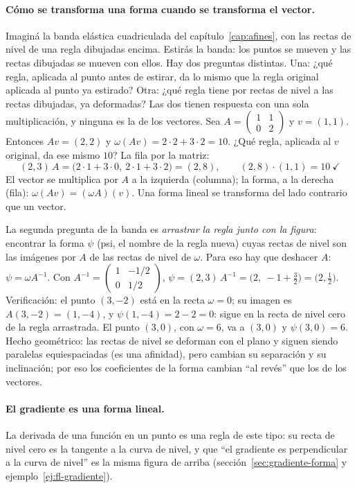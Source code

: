 \paragraph{Cómo se transforma una forma cuando se transforma el vector.} Imaginá la banda
elástica cuadriculada del capítulo~\ref{cap:afines}, con las rectas de nivel de una regla
dibujadas encima. Estirás la banda: los puntos se mueven y las rectas dibujadas se mueven con
ellos. Hay dos preguntas distintas. Una: ¿qué regla, aplicada al punto antes de estirar, da lo
mismo que la regla original aplicada al punto ya estirado? Otra: ¿qué regla tiene por rectas
de nivel a las rectas dibujadas, ya deformadas? Las dos tienen respuesta con una sola
multiplicación, y ninguna es la de los vectores. Sea
\(A=\begin{pmatrix}1&1\\0&2\end{pmatrix}\) y \(v=(1,1)\). Entonces \(Av=(2,2)\) y
\(\omega(Av)=2\cdot2+3\cdot2=10\). ¿Qué regla, aplicada al \(v\) original, da ese mismo
\(10\)? La fila por la matriz:
\[
  (2,3)\,A=\bigl(2\cdot1+3\cdot0,\ 2\cdot1+3\cdot2\bigr)=(2,8),
  \qquad (2,8)\cdot(1,1)=10\ \checkmark
\]
El vector se multiplica por \(A\) a la izquierda (columna); la forma, a la derecha (fila):
\(\omega(Av)=(\omega A)(v)\). Una forma lineal se transforma del lado contrario que un vector.

La segunda pregunta de la banda es \emph{arrastrar la regla junto con la figura}: encontrar la forma \(\psi\) (psi, el nombre de la regla nueva) cuyas
rectas de nivel son las imágenes por \(A\) de las rectas de nivel de \(\omega\). Para eso hay que
deshacer \(A\): \(\psi=\omega A^{-1}\). Con
\(A^{-1}=\left(\begin{smallmatrix}1&-1/2\\0&1/2\end{smallmatrix}\right)\),
\(\psi=(2,3)\,A^{-1}=\bigl(2,\ -1+\tfrac32\bigr)=\bigl(2,\tfrac12\bigr)\). Verificación: el punto \((3,-2)\) está en la recta \(\omega=0\); su imagen es
\(A(3,-2)=(1,-4)\), y \(\psi(1,-4)=2-2=0\): sigue en la recta de nivel cero de la regla
arrastrada. El punto \((3,0)\), con \(\omega=6\), va a \((3,0)\) y \(\psi(3,0)=6\).
Hecho geométrico: las rectas de nivel se deforman con el plano y siguen siendo paralelas
equiespaciadas (es una afinidad), pero cambian su separación y su inclinación; por eso los
coeficientes de la forma cambian \enquote{al revés} que los de los vectores.

\paragraph{El gradiente es una forma lineal.} La derivada de una función en un punto es una
regla de este tipo: su recta de nivel cero es la tangente a la curva de nivel, y que
\enquote{el gradiente es perpendicular a la curva de nivel} es la misma figura de arriba
(sección~\ref{sec:gradiente-forma} y ejemplo~\ref{ej:fl-gradiente}).

